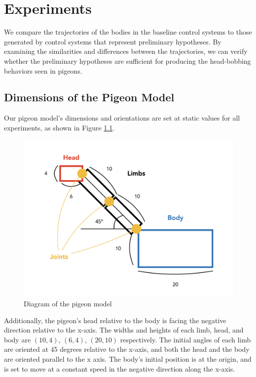 \chapter{Experiments} \label{ch:experiments}
We compare the trajectories of the bodies in the baseline control systems to those generated by control systems that represent preliminary hypotheses. By examining the similarities and differences between the trajectories, we can verify whether the preliminary hypotheses are sufficient for producing the head-bobbing behaviors seen in pigeons.

\section{Dimensions of the Pigeon Model}
  Our pigeon model's dimensions and orientations are set at static values for all experiments, as shown in Figure \ref{fig:pigeon_dimension}.
    \begin{figure}[H]
        \centering
        \includegraphics[width=1\textwidth]{figures/pigeon_diagram/pigeon_diagram_001.png}
        \caption{Diagram of the pigeon model}
        \label{fig:pigeon_dimension}
    \end{figure}
  Additionally, the pigeon's head relative to the body is facing the negative direction relative to the x-axis.
  The widths and heights of each limb, head, and body are $(10, 4)$, $(6, 4)$, $(20, 10)$ respectively.
  The initial angles of each limb are oriented at 45 degrees relative to the x-axis, and both the head and the body are oriented parallel to the x axis.
  The body's initial position is at the origin, and is set to move at a constant speed in the negative direction along the x-axis.

